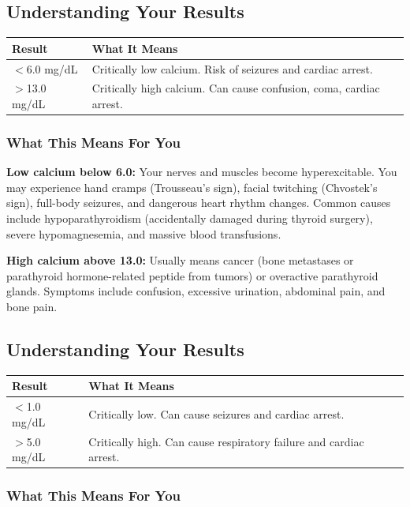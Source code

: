 \subsection{Understanding Your Results}

\begin{longtable}{@{}ll@{}}
\toprule
\textbf{Result} & \textbf{What It Means} \\
\midrule
$<$6.0 mg/dL & Critically low calcium. Risk of seizures and cardiac arrest. \\
$>$13.0 mg/dL & Critically high calcium. Can cause confusion, coma, cardiac arrest. \\
\bottomrule
\end{longtable}

\subsubsection{What This Means For You}

\textbf{Low calcium below 6.0:} Your nerves and muscles become hyperexcitable. You may experience hand cramps (Trousseau's sign), facial twitching (Chvostek's sign), full-body seizures, and dangerous heart rhythm changes. Common causes include hypoparathyroidism (accidentally damaged during thyroid surgery), severe hypomagnesemia, and massive blood transfusions.

\textbf{High calcium above 13.0:} Usually means cancer (bone metastases or parathyroid hormone-related peptide from tumors) or overactive parathyroid glands. Symptoms include confusion, excessive urination, abdominal pain, and bone pain.

\subsection{Understanding Your Results}

\begin{longtable}{@{}ll@{}}
\toprule
\textbf{Result} & \textbf{What It Means} \\
\midrule
$<$1.0 mg/dL & Critically low. Can cause seizures and cardiac arrest. \\
$>$5.0 mg/dL & Critically high. Can cause respiratory failure and cardiac arrest. \\
\bottomrule
\end{longtable}

\subsubsection{What This Means For You}


